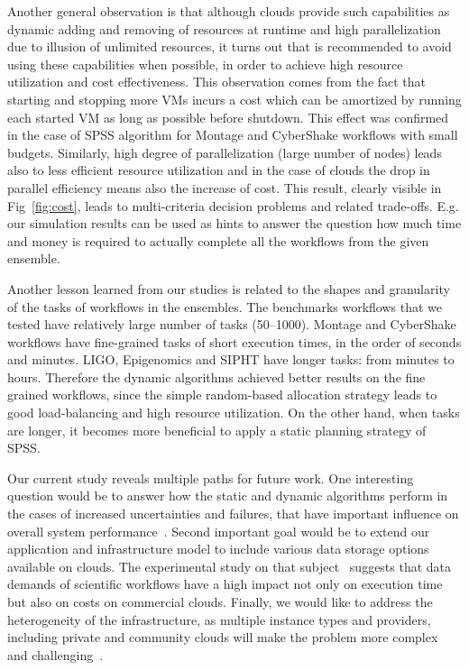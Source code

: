 \documentclass{sig-alternate}
\begin{document}
Another general observation is that although clouds provide such capabilities as
dynamic adding and removing of resources at runtime and high parallelization due
to illusion of unlimited resources, it turns out that is recommended to avoid
using these capabilities when possible, in order to achieve high resource
utilization and cost effectiveness. This observation comes from the fact that
starting and stopping more VMs incurs a cost which can be amortized by running
each started VM as long as possible before shutdown. This effect was confirmed
in the case of SPSS algorithm for Montage and CyberShake workflows with small
budgets. Similarly, high degree of parallelization (large number of nodes) leads
also to less efficient resource utilization and in the case of clouds the drop
in parallel efficiency means also the increase of cost. This result, clearly
visible in Fig~\ref{fig:cost}, leads to multi-criteria decision problems and
related trade-offs. E.g. our simulation results can be used as hints to answer
the question how much time and money is required to actually complete all the
workflows from the given ensemble.

Another lesson learned from our studies is related to the shapes and granularity
of the tasks of workflows in the ensembles. The benchmarks workflows that we
tested have relatively large number of tasks (50--1000). Montage and CyberShake
workflows have fine-grained tasks of short execution times, in the order of
seconds and minutes. LIGO, Epigenomics and SIPHT have longer tasks: from minutes to hours.
Therefore the dynamic algorithms achieved better results on the fine grained
workflows, since the simple random-based allocation strategy leads to good
load-balancing and high resource utilization. On the other hand, when tasks are
longer, it becomes more beneficial to apply a static planning strategy of SPSS.

Our current study reveals multiple paths for future work. One interesting
question would be to answer how the static and dynamic algorithms perform in the
cases of increased uncertainties and failures, that have important influence
on overall system performance~\cite{Sakellariou2010,Dongarra2007}. Second
important goal would be to extend our application and infrastructure model to
include various data storage options available on clouds. The experimental study
on that subject~\cite{Juve2010} suggests that data demands of scientific
workflows have a high impact not only on execution time but also on costs on
commercial clouds. Finally, we would like to address the heterogeneity of the
infrastructure, as multiple instance types and providers, including private
and community clouds will make the problem more complex and
challenging~\cite{Marshall2010,vockler11,Juve2010}.







\end{document}
